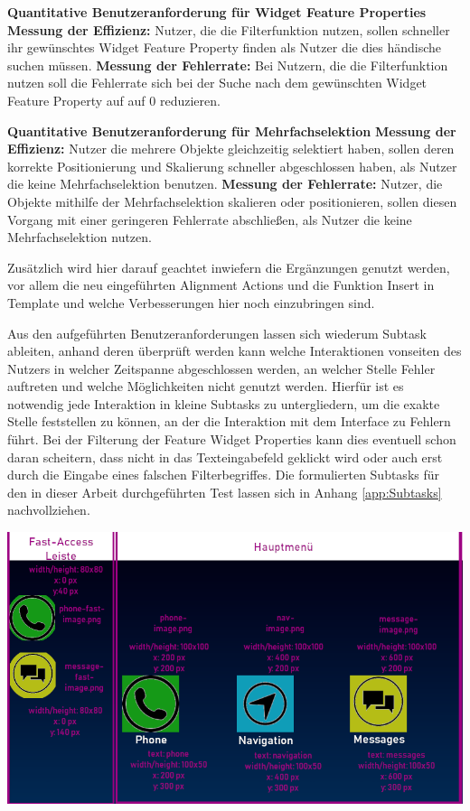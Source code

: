 \textbf{Quantitative Benutzeranforderung für Widget Feature Properties} \newline
\textbf{Messung der Effizienz:}
Nutzer, die die Filterfunktion nutzen, sollen schneller ihr gewünschtes Widget Feature Property finden als Nutzer die dies händische suchen müssen. \newline
\textbf{Messung der Fehlerrate:}
Bei Nutzern, die die Filterfunktion nutzen soll die Fehlerrate sich bei der Suche nach dem gewünschten Widget Feature Property auf auf 0 reduzieren.

\textbf{Quantitative Benutzeranforderung für Mehrfachselektion}\newline
\textbf{Messung der Effizienz:}
Nutzer die mehrere Objekte gleichzeitig selektiert haben, sollen deren korrekte Positionierung  und Skalierung schneller abgeschlossen haben, als Nutzer die keine Mehrfachselektion benutzen.\newline
\textbf{Messung der Fehlerrate:}
Nutzer, die Objekte mithilfe der Mehrfachselektion skalieren oder positionieren, sollen diesen Vorgang mit einer geringeren Fehlerrate abschließen, als Nutzer die keine Mehrfachselektion nutzen.

Zusätzlich wird hier darauf geachtet inwiefern die Ergänzungen genutzt werden, vor allem die neu eingeführten \glqq Alignment Actions\grqq{} und die Funktion \glqq Insert in Template\grqq{} und welche Verbesserungen hier noch einzubringen sind.

Aus den aufgeführten Benutzeranforderungen lassen sich wiederum Subtask ableiten, anhand deren überprüft werden kann welche Interaktionen vonseiten des Nutzers in welcher Zeitspanne abgeschlossen werden, an welcher Stelle Fehler auftreten und welche Möglichkeiten nicht genutzt werden.
Hierfür ist es notwendig jede Interaktion in kleine Subtasks zu untergliedern, um die exakte Stelle feststellen zu können, an der die Interaktion mit dem Interface zu Fehlern führt.
Bei der Filterung der Feature Widget Properties kann dies eventuell schon daran scheitern, dass nicht in das Texteingabefeld geklickt wird oder auch erst durch die Eingabe eines falschen Filterbegriffes.
Die formulierten Subtasks für den in dieser Arbeit durchgeführten Test lassen sich in Anhang \ref{app:Subtasks} nachvollziehen.

\begin{center}
  \includegraphics[width=\textwidth]{figures/Styleguide_Rahmen.png}
  \label{fig:Styleguide}
\end{center}

